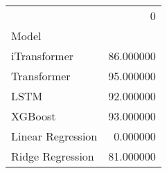 \begin{tabular}{lr}
\toprule
 & 0 \\
Model &  \\
\midrule
iTransformer & 86.000000 \\
Transformer & 95.000000 \\
LSTM & 92.000000 \\
XGBoost & 93.000000 \\
Linear Regression & 0.000000 \\
Ridge Regression & 81.000000 \\
\bottomrule
\end{tabular}
